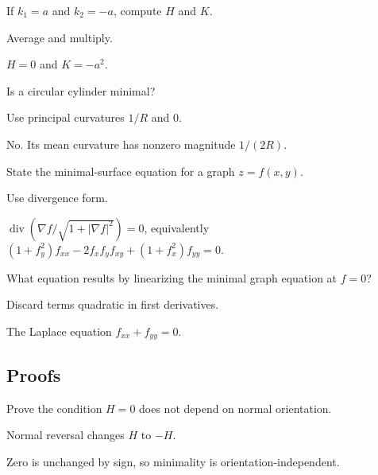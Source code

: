 \begin{exercise}\label{exr:vii19-ped-02}
If \(k_1=a\) and \(k_2=-a\), compute \(H\) and \(K\).
\end{exercise}
\begin{hint}
Average and multiply.
\end{hint}
\begin{solution}
\(H=0\) and \(K=-a^2\).
\end{solution}

\begin{exercise}\label{exr:vii19-ped-03}
Is a circular cylinder minimal?
\end{exercise}
\begin{hint}
Use principal curvatures \(1/R\) and \(0\).
\end{hint}
\begin{solution}
No.  Its mean curvature has nonzero magnitude \(1/(2R)\).
\end{solution}

\begin{exercise}\label{exr:vii19-ped-04}
State the minimal-surface equation for a graph \(z=f(x,y)\).
\end{exercise}
\begin{hint}
Use divergence form.
\end{hint}
\begin{solution}
\(\operatorname{div}\left(\nabla f/\sqrt{1+|\nabla f|^2}\right)=0\), equivalently \((1+f_y^2)f_{xx}-2f_xf_yf_{xy}+(1+f_x^2)f_{yy}=0\).
\end{solution}

\begin{exercise}[Linearization]\label{exr:vii19-ped-05}
What equation results by linearizing the minimal graph equation at \(f=0\)?
\end{exercise}
\begin{hint}
Discard terms quadratic in first derivatives.
\end{hint}
\begin{solution}
The Laplace equation \(f_{xx}+f_{yy}=0\).
\end{solution}

\subsection*{Proofs}

\begin{exercise}\label{exr:vii19-ped-06}
Prove the condition \(H=0\) does not depend on normal orientation.
\end{exercise}
\begin{hint}
Normal reversal changes \(H\) to \(-H\).
\end{hint}
\begin{solution}
Zero is unchanged by sign, so minimality is orientation-independent.
\end{solution}

